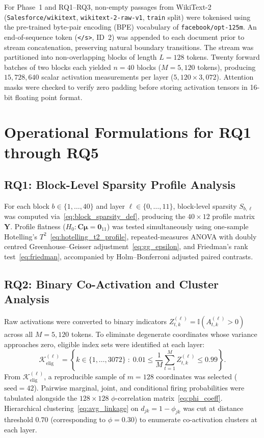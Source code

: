 \documentclass[12pt, a4paper, oneside]{report}
\theoremstyle{definition}
\newcommand{\vect}[1]{\mathbf{#1}}
\newcommand{\mat}[1]{\mathbf{#1}}
\newcommand{\Ind}{\mathbb{I}}
\begin{document}
For Phase~1 and RQ1--RQ3, non-empty passages from WikiText-2 (\texttt{Salesforce/wikitext}, \texttt{wikitext-2-raw-v1}, \texttt{train} split) were tokenised using the pre-trained byte-pair encoding (BPE) vocabulary of \texttt{facebook/opt-125m}. An end-of-sequence token (\texttt{</s>}, ID~2) was appended to each document prior to stream concatenation, preserving natural boundary transitions. The stream was partitioned into non-overlapping blocks of length $L = 128$ tokens. Twenty forward batches of two blocks each yielded $n = 40$ blocks ($M = 5{,}120$ tokens), producing $15{,}728{,}640$ scalar activation measurements per layer ($5{,}120 \times 3{,}072$). Attention masks were checked to verify zero padding before storing activation tensors in 16-bit floating point format.

\section{Operational Formulations for RQ1 through RQ5}

\subsection{RQ1: Block-Level Sparsity Profile Analysis}

For each block $b \in \{1, \dots, 40\}$ and layer $\ell \in \{0, \dots, 11\}$, block-level sparsity $S_{b,\ell}$ was computed via~\eqref{eq:block_sparsity_def}, producing the $40 \times 12$ profile matrix $\mat{Y}$. Profile flatness ($H_0 : \mat{C}\boldsymbol{\mu} = \vect{0}_{11}$) was tested simultaneously using one-sample Hotelling's $T^2$~\eqref{eq:hotelling_t2_profile}, repeated-measures ANOVA with doubly centred Greenhouse--Geisser adjustment~\eqref{eq:gg_epsilon}, and Friedman's rank test~\eqref{eq:friedman}, accompanied by Holm--Bonferroni adjusted paired contrasts.

\subsection{RQ2: Binary Co-Activation and Cluster Analysis}

Raw activations were converted to binary indicators $Z_{t,k}^{(\ell)} = \Ind(A_{t,k}^{(\ell)} > 0)$ across all $M = 5{,}120$ tokens. To eliminate degenerate coordinates whose variance approaches zero, eligible index sets were identified at each layer:
\begin{equation}
    \mathcal{K}_{\text{elig}}^{(\ell)} = \left\{k \in \{1, \dots, 3072\} \;:\; 0.01 \le \frac{1}{M}\sum_{t=1}^{M} Z_{t,k}^{(\ell)} \le 0.99\right\}.
    \label{eq:prevalence_filter}
\end{equation}
From $\mathcal{K}_{\text{elig}}^{(\ell)}$, a reproducible sample of $m = 128$ coordinates was selected ($\text{seed} = 42$). Pairwise marginal, joint, and conditional firing probabilities were tabulated alongside the $128 \times 128$ $\phi$-correlation matrix~\eqref{eq:phi_coeff}. Hierarchical clustering~\eqref{eq:avg_linkage} on $d_{jk} = 1 - \phi_{jk}$ was cut at distance threshold $0.70$ (corresponding to $\phi = 0.30$) to enumerate co-activation clusters at each layer.
\end{document}
